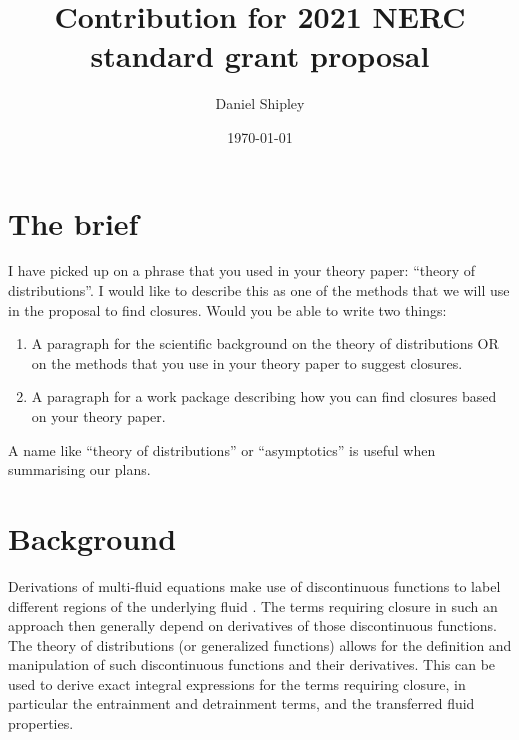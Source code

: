 \documentclass[12pt]{article}
\title{Contribution for 2021 NERC standard grant proposal}
\author{Daniel Shipley}
\date{\today}
\begin{document}
    
\maketitle
\section*{The brief}
I have picked up on a phrase that you used in your theory paper: ``theory of distributions''. I would like to describe this as one of the methods that we will use in the proposal to find closures. Would you be able to write two things:
\begin{enumerate}
    \item A paragraph for the scientific background on the theory of distributions OR on the methods that you use in your theory paper to suggest closures.
    \item A paragraph for a work package describing how you can find closures based on your theory paper.
\end{enumerate}

A name like ``theory of distributions'' or ``asymptotics'' is  useful when summarising our plans.
\section{Background}
Derivations of multi-fluid equations make use of discontinuous functions to label different regions of the underlying fluid \parencite{ar:Dopazo1977,ar:Yano2014,ar:ThuburnEtAl2018,ar:TanEtAl2018}. The terms requiring closure in such an approach then generally depend on derivatives of those discontinuous functions. The theory of distributions (or generalized functions) \parencite{bk:Schwartz_Distributions} allows for the definition and manipulation of such discontinuous functions and their derivatives. This can be used to derive exact integral expressions for the terms requiring closure, in particular the entrainment and detrainment terms, and the transferred fluid properties.
\end{document}
